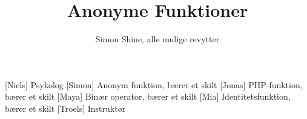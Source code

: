 \documentclass[a4paper,11pt]{article}
\title{Anonyme Funktioner}
\author{Simon Shine, alle mulige revytter}
\begin{document}
\maketitle

\begin{roles}
    [Niels] Psykolog
    [Simon] Anonym funktion, bærer et skilt
    [Jonas] PHP-funktion, bærer et skilt
    [Maya] Binær operator, bærer et skilt
    [Mia] Identitetsfunktion, bærer et skilt
    [Troels] Instruktør
\end{roles}

\begin{props}
\end{props}
\end{document}
